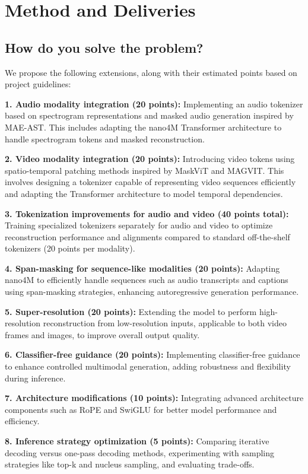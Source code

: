 \documentclass[10pt,conference,compsocconf]{IEEEtran}
\begin{document}
\section{Method and Deliveries}

\subsection{How do you solve the problem?}
We propose the following extensions, along with their estimated points based on project guidelines:

\textbf{1. Audio modality integration (20 points):}
Implementing an audio tokenizer based on spectrogram representations and masked audio generation inspired by MAE-AST. This includes adapting the nano4M Transformer architecture to handle spectrogram tokens and masked reconstruction.

\textbf{2. Video modality integration (20 points):}
Introducing video tokens using spatio-temporal patching methods inspired by MaskViT and MAGVIT. This involves designing a tokenizer capable of representing video sequences efficiently and adapting the Transformer architecture to model temporal dependencies.

\textbf{3. Tokenization improvements for audio and video (40 points total):}
Training specialized tokenizers separately for audio and video to optimize reconstruction performance and alignments compared to standard off-the-shelf tokenizers (20 points per modality).

\textbf{4. Span-masking for sequence-like modalities (20 points):}
Adapting nano4M to efficiently handle sequences such as audio transcripts and captions using span-masking strategies, enhancing autoregressive generation performance.

\textbf{5. Super-resolution (20 points):}
Extending the model to perform high-resolution reconstruction from low-resolution inputs, applicable to both video frames and images, to improve overall output quality.

\textbf{6. Classifier-free guidance (20 points):}
Implementing classifier-free guidance to enhance controlled multimodal generation, adding robustness and flexibility during inference.

\textbf{7. Architecture modifications (10 points):}
Integrating advanced architecture components such as RoPE and SwiGLU for better model performance and efficiency.

\textbf{8. Inference strategy optimization (5 points):}
Comparing iterative decoding versus one-pass decoding methods, experimenting with sampling strategies like top-k and nucleus sampling, and evaluating trade-offs.
\end{document}

